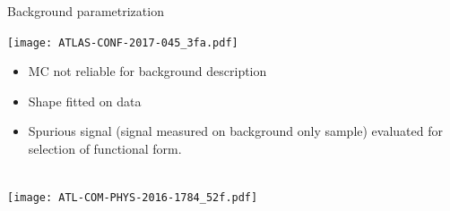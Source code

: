 \begin{frame}{Background parametrization}
  \begin{minipage}{0.45\linewidth}
    \texttt{[image: ATLAS-CONF-2017-045\_3fa.pdf]}
  \end{minipage}
  \hfill
  \begin{minipage}{0.45\linewidth}
    \begin{itemize}
    \item MC not reliable for background description
    \item Shape fitted on data
    \item Spurious signal (signal measured on background only sample) evaluated for selection of functional form.
    \end{itemize}
  \end{minipage}\\
  \texttt{[image: ATL-COM-PHYS-2016-1784\_52f.pdf]}
\end{frame}

